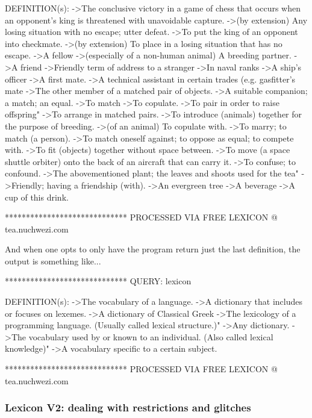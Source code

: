 \documentclass[a4paper, 18pt]{book} %
\begin{document}
{{{\begin{tcbverbatim}[title=Sample OUTPUT 1 from LEXICON v1 --- a list of definitions]
DEFINITION(s):
->The conclusive victory in a game of chess that occurs when an opponent's king is threatened with unavoidable capture.
->(by extension) Any losing situation with no escape; utter defeat.
->To put the king of an opponent into checkmate.
->(by extension) To place in a losing situation that has no escape.
->A fellow
->(especially of a non-human animal) A breeding partner.
->A friend
->Friendly term of address to a stranger
->In naval ranks
->A ship's officer
->A first mate.
->A technical assistant in certain trades (e.g. gasfitter's mate
->The other member of a matched pair of objects.
->A suitable companion; a match; an equal.
->To match
->To copulate.
->To pair in order to raise offspring"
->To arrange in matched pairs.
->To introduce (animals) together for the purpose of breeding.
->(of an animal) To copulate with.
->To marry; to match (a person).
->To match oneself against; to oppose as equal; to compete with.
->To fit (objects) together without space between.
->To move (a space shuttle orbiter) onto the back of an aircraft that can carry it.
->To confuse; to confound.
->The abovementioned plant; the leaves and shoots used for the tea"
->Friendly; having a friendship (with).
->An evergreen tree
->A beverage
->A cup of this drink.

*****************************
PROCESSED VIA FREE LEXICON @ tea.nuchwezi.com
  \end{tcbverbatim}
 \vspace{2em}
 
 
 And when one opts to only have the program return just the last definition, the output is something like...
 
 
  \vspace{2em}
 \begin{tcbverbatim}[title=Sample OUTPUT 2 from LEXICON v1 --- a single definition]
*****************************
QUERY: lexicon

DEFINITION(s):
->The vocabulary of a language.
->A dictionary that includes or focuses on lexemes.
->A dictionary of Classical Greek
->The lexicology of a programming language. (Usually called lexical structure.)"
->Any dictionary.
->The vocabulary used by or known to an individual. (Also called lexical knowledge)"
->A vocabulary specific to a certain subject.

*****************************
PROCESSED VIA FREE LEXICON @ tea.nuchwezi.com
  \end{tcbverbatim}
 \vspace{2em}


\subsubsection{Lexicon V2: dealing with restrictions and glitches}

}}}
\end{document}
